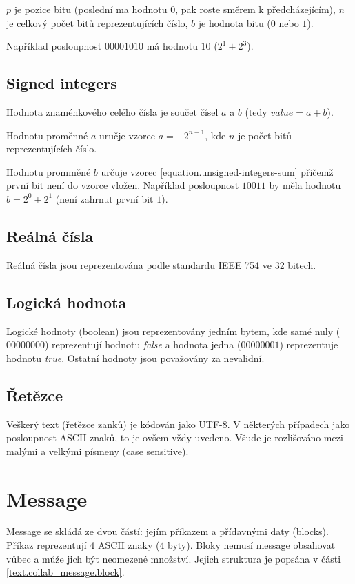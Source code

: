 \documentclass[12pt,oneside,a4paper]{report}
\begin{document}
$p$ je pozice bitu (poslední ma hodnotu 0, pak roste směrem k předcházejícím), $n$ je celkový počet bitů reprezentujících číslo, $b$ je hodnota bitu ($0$ nebo $1$).

Například posloupnost $00001010$ má hodnotu $10$ ($2^1 + 2^3$).

\subsection{Signed integers}

Hodnota znaménkového celého čísla je součet čísel $a$ a $b$ (tedy ${value} = a + b$). 

Hodnotu proměnné $a$ uručje vzorec $a = -2^{n - 1}$, kde $n$ je počet bitů reprezentujících číslo.

Hodnotu promměné $b$ určuje vzorec \ref{equation.unsigned-integers-sum} přičemž první bit není do vzorce vložen. Například posloupnost $10011$ by měla hodnotu $b = 2^0 + 2^1$ (není zahrnut první bit $1$). 

\subsection{Reálná čísla}

Reálná čísla jsou reprezentována podle standardu IEEE 754 ve 32 bitech.

\subsection{Logická hodnota} 

Logické hodnoty (boolean) jsou reprezentovány jedním bytem, kde samé nuly ($00000000$) reprezentují hodnotu \emph{false} a hodnota jedna ($00000001$) reprezentuje hodnotu \emph{true}. Ostatní hodnoty jsou považovány za nevalidní.

\subsection{Řetězce}

Veškerý text (řetězce zanků) je kódován jako UTF-8. V některých případech jako posloupnost ASCII znaků, to je ovšem vždy uvedeno. Všude je rozlišováno mezi malými a velkými písmeny (case sensitive).

\section{Message}

Message se skládá ze dvou částí: jejím příkazem a přídavnými daty (blocks). Příkaz reprezentují 4 ASCII znaky (4 byty). Bloky nemusí message obsahovat vůbec a může jich být neomezené množství. Jejich struktura je popsána v části \ref{text.collab_message.block}.
\end{document}
